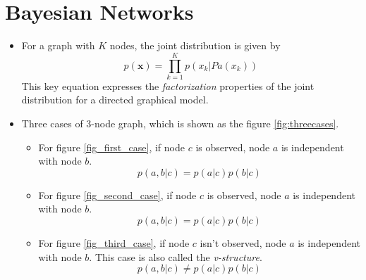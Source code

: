 \documentclass[12pt, a4paper]{article}
\begin{document}
    \section{Bayesian Networks}
    \begin{itemize}
        \item For a graph with $K$ nodes, the joint distribution is given by \begin{equation*}
            p(\bm{x})=\prod_{k=1}^Kp(x_k|Pa(x_k))
        \end{equation*}
        This key equation expresses the \textit{factorization} properties of the joint 
        distribution for a directed graphical model.
        \item Three cases of 3-node graph, which is shown as the figure \ref{fig:threecases}.
        \begin{itemize}
            \item For figure \ref{fig_first_case}, if node $c$ is observed, node $a$ is independent 
            with node $b$.
            \begin{equation*}
                p(a,b|c)=p(a|c)p(b|c)
            \end{equation*}
            \item For figure \ref{fig_second_case}, if node $c$ is observed, node $a$ is independent
            with node $b$.
            \begin{equation*}
                p(a,b|c)=p(a|c)p(b|c)
            \end{equation*}
            \item For figure \ref{fig_third_case}, if node $c$ isn't observed, 
            node $a$ is independent with node $b$. This case is also called the \textit{v-structure}.
            \begin{equation*}
                p(a,b|c)\neq p(a|c)p(b|c)
            \end{equation*}
        \end{itemize}
        \begin{figure}[htbp]
            \centering
            \hfil

\end{figure}
\end{itemize}
\end{document}
